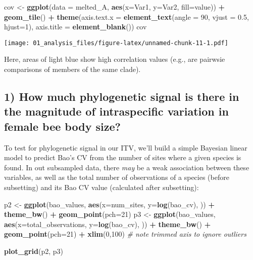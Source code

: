 \documentclass[
]{article}
\newenvironment{Shaded}{\begin{snugshade}}{\end{snugshade}}
\newcommand{\AttributeTok}[1]{\textcolor[rgb]{0.13,0.29,0.53}{#1}}
\newcommand{\CommentTok}[1]{\textcolor[rgb]{0.56,0.35,0.01}{\textit{#1}}}
\newcommand{\DecValTok}[1]{\textcolor[rgb]{0.00,0.00,0.81}{#1}}
\newcommand{\FloatTok}[1]{\textcolor[rgb]{0.00,0.00,0.81}{#1}}
\newcommand{\FunctionTok}[1]{\textcolor[rgb]{0.13,0.29,0.53}{\textbf{#1}}}
\newcommand{\NormalTok}[1]{#1}
\newcommand{\OtherTok}[1]{\textcolor[rgb]{0.56,0.35,0.01}{#1}}
\newcommand{\SpecialCharTok}[1]{\textcolor[rgb]{0.81,0.36,0.00}{\textbf{#1}}}
\begin{document}
\begin{Shaded}
\begin{Highlighting}[]
\NormalTok{cov }\OtherTok{\textless{}{-}} \FunctionTok{ggplot}\NormalTok{(}\AttributeTok{data =}\NormalTok{ melted\_A, }\FunctionTok{aes}\NormalTok{(}\AttributeTok{x=}\NormalTok{Var1, }\AttributeTok{y=}\NormalTok{Var2, }\AttributeTok{fill=}\NormalTok{value)) }\SpecialCharTok{+} 
  \FunctionTok{geom\_tile}\NormalTok{() }\SpecialCharTok{+}
  \FunctionTok{theme}\NormalTok{(}\AttributeTok{axis.text.x =} \FunctionTok{element\_text}\NormalTok{(}\AttributeTok{angle =} \DecValTok{90}\NormalTok{, }\AttributeTok{vjust =} \FloatTok{0.5}\NormalTok{, }\AttributeTok{hjust=}\DecValTok{1}\NormalTok{), }\AttributeTok{axis.title =} \FunctionTok{element\_blank}\NormalTok{())}
\NormalTok{cov}
\end{Highlighting}
\end{Shaded}

\texttt{[image: 01\_analysis\_files/figure-latex/unnamed-chunk-11-1.pdf]}

Here, areas of light blue show high correlation values (e.g., are
pairwsie comparisons of members of the same clade).

\subsection{1) How much phylogenetic signal is there in the magnitude of
intraspecific variation in female bee body
size?}\label{how-much-phylogenetic-signal-is-there-in-the-magnitude-of-intraspecific-variation-in-female-bee-body-size}

To test for phylogenetic signal in our ITV, we'll build a simple
Bayesian linear model to predict Bao's CV from the number of sites where
a given species is found. In out subsampled data, there \emph{may} be a
weak association between these variables, as well as the total number of
observations of a species (before subsetting) and its Bao CV value
(calculated after subsetting):

\begin{Shaded}
\begin{Highlighting}[]
\NormalTok{p2 }\OtherTok{\textless{}{-}} \FunctionTok{ggplot}\NormalTok{(bao\_values, }\FunctionTok{aes}\NormalTok{(}\AttributeTok{x=}\NormalTok{num\_sites, }\AttributeTok{y=}\FunctionTok{log}\NormalTok{(bao\_cv), )) }\SpecialCharTok{+} 
  \FunctionTok{theme\_bw}\NormalTok{() }\SpecialCharTok{+}
  \FunctionTok{geom\_point}\NormalTok{(}\AttributeTok{pch=}\DecValTok{21}\NormalTok{)}
\NormalTok{p3 }\OtherTok{\textless{}{-}} \FunctionTok{ggplot}\NormalTok{(bao\_values, }\FunctionTok{aes}\NormalTok{(}\AttributeTok{x=}\NormalTok{total\_observations, }\AttributeTok{y=}\FunctionTok{log}\NormalTok{(bao\_cv), )) }\SpecialCharTok{+} 
  \FunctionTok{theme\_bw}\NormalTok{() }\SpecialCharTok{+}
  \FunctionTok{geom\_point}\NormalTok{(}\AttributeTok{pch=}\DecValTok{21}\NormalTok{) }\SpecialCharTok{+}
  \FunctionTok{xlim}\NormalTok{(}\DecValTok{0}\NormalTok{,}\DecValTok{100}\NormalTok{) }\CommentTok{\# note trimmed axis to ignore outliers}

\FunctionTok{plot\_grid}\NormalTok{(p2, p3)}
\end{Highlighting}
\end{Shaded}
\end{document}
